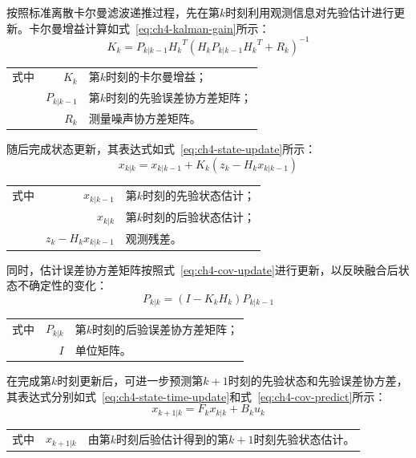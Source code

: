按照标准离散卡尔曼滤波递推过程，先在第$k$时刻利用观测信息对先验估计进行更新。卡尔曼增益计算如式~\eqref{eq:ch4-kalman-gain}所示：
\begin{equation}
\label{eq:ch4-kalman-gain}
K_{k} = P_{k|k-1}{H_{k}}^{T}\left( H_{k}P_{k|k-1}{H_{k}}^{T} + R_{k} \right)^{-1}
\end{equation}
\begin{tabularx}{\textwidth}{@{}l@{\quad}r@{———}X@{}}
式中& $K_k$ & 第$k$时刻的卡尔曼增益；\\
& $P_{k|k-1}$ & 第$k$时刻的先验误差协方差矩阵；\\
& $R_k$ & 测量噪声协方差矩阵。\\
\end{tabularx}\vspace{3.15bp}

随后完成状态更新，其表达式如式~\eqref{eq:ch4-state-update}所示：
\begin{equation}
\label{eq:ch4-state-update}
x_{k|k} = x_{k|k-1} + K_{k}\left( z_{k} - H_{k}x_{k|k-1} \right)
\end{equation}
\begin{tabularx}{\textwidth}{@{}l@{\quad}r@{———}X@{}}
式中& $x_{k|k-1}$ & 第$k$时刻的先验状态估计；\\
& $x_{k|k}$ & 第$k$时刻的后验状态估计；\\
& $z_k-H_kx_{k|k-1}$ & 观测残差。\\
\end{tabularx}\vspace{3.15bp}

同时，估计误差协方差矩阵按照式~\eqref{eq:ch4-cov-update}进行更新，以反映融合后状态不确定性的变化：
\begin{equation}
\label{eq:ch4-cov-update}
P_{k|k} = \left( I - K_{k}H_{k} \right)P_{k|k-1}
\end{equation}
\begin{tabularx}{\textwidth}{@{}l@{\quad}r@{———}X@{}}
式中& $P_{k|k}$ & 第$k$时刻的后验误差协方差矩阵；\\
& $I$ & 单位矩阵。\\
\end{tabularx}\vspace{3.15bp}

在完成第$k$时刻更新后，可进一步预测第$k+1$时刻的先验状态和先验误差协方差，其表达式分别如式~\eqref{eq:ch4-state-time-update}和式~\eqref{eq:ch4-cov-predict}所示：
\begin{equation}
\label{eq:ch4-state-time-update}
x_{k+1|k} = F_{k}x_{k|k} + B_{k}u_{k}
\end{equation}
\begin{tabularx}{\textwidth}{@{}l@{\quad}r@{———}X@{}}
式中& $x_{k+1|k}$ & 由第$k$时刻后验估计得到的第$k+1$时刻先验状态估计。\\
\end{tabularx}\vspace{3.15bp}

